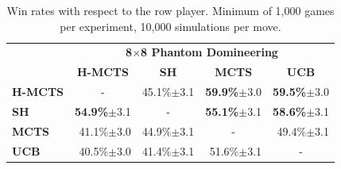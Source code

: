 \documentclass[a4paper]{llncs}
\begin{document}
\begin{table}[ht]
\begin{tabular}{@{}lrrrr@{}}
\toprule
& \multicolumn{4}{c}{\textbf{8$\times$8 Phantom Domineering}}       \\
& \multicolumn{1}{c}{\textbf{H-MCTS}} & \multicolumn{1}{c}{\textbf{SH}} & \multicolumn{1}{c}{\textbf{MCTS}} & \multicolumn{1}{c}{\textbf{UCB}} \\ [1mm] \cmidrule(l){2-5} 
\textbf{H-MCTS} & \multicolumn{1}{c}{-}		& 45.1\%$\pm$3.1			& \textbf{59.9\%}$\pm$3.0 	& \textbf{59.5\%}$\pm$3.0 		\\[.5mm] 
\textbf{SH}     & \textbf{54.9\%}$\pm$3.1	& \multicolumn{1}{c}{-}		& \textbf{55.1\%}$\pm$3.1	& \textbf{58.6\%}$\pm$3.1 		\\[.5mm] 
\textbf{MCTS}   & 41.1\%$\pm$3.0			& 44.9\%$\pm$3.1			& \multicolumn{1}{c}{-} 	& 49.4\%$\pm$3.1  				\\[.5mm] 
\textbf{UCB}	& 40.5\%$\pm$3.0			& 41.4\%$\pm$3.1			& 51.6\%$\pm$3.1			& \multicolumn{1}{c}{-} 		\\[.5mm] \bottomrule
\end{tabular}

\vspace{2mm}
{\caption{Win rates with respect to the row player. Minimum of 1,000 games per experiment, 10,000 simulations per move.} \label{tab:results_10k}}
\end{table}
\end{document}
